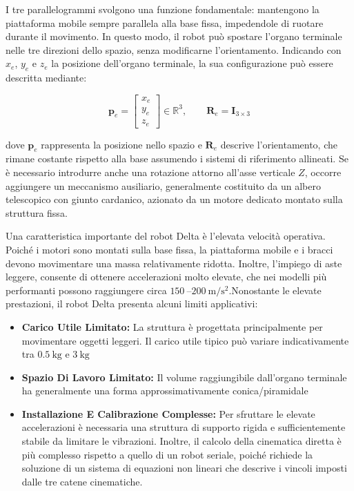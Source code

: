 ﻿\documentclass[11pt, a4paper]{article}
\begin{document}
I tre parallelogrammi svolgono una funzione fondamentale: mantengono la piattaforma mobile sempre parallela alla base fissa, impedendole di ruotare durante il movimento. In questo modo, il robot può spostare l'organo terminale nelle tre direzioni dello spazio, senza modificarne l'orientamento. Indicando con $x_e$, $y_e$ e $z_e$ la posizione dell'organo terminale, la sua configurazione può essere descritta mediante:

\[
    \boldsymbol{p}_e =
    \begin{bmatrix}
        x_e \\ y_e \\ z_e
    \end{bmatrix}
    \in \mathbb{R}^3,
    \qquad
    \boldsymbol{R}_e = \boldsymbol{I}_{3 \times 3}
\]

dove $\boldsymbol{p}_e$ rappresenta la posizione nello spazio e $\boldsymbol{R}_e$ descrive l'orientamento, che rimane costante rispetto alla base assumendo i sistemi di riferimento allineati. Se è necessario introdurre anche una rotazione attorno all'asse verticale $Z$, occorre aggiungere un meccanismo ausiliario, generalmente costituito da un albero telescopico con giunto cardanico, azionato da un motore dedicato montato sulla struttura fissa.

Una caratteristica importante del robot Delta è l'elevata velocità operativa. Poiché i motori sono montati sulla base fissa, la piattaforma mobile e i bracci devono movimentare una massa relativamente ridotta. Inoltre, l'impiego di aste leggere, consente di ottenere accelerazioni molto elevate, che nei modelli più performanti possono raggiungere circa $\SI{150}{}$--$\SI{200}{\meter\per\second\squared}$.Nonostante le elevate prestazioni, il robot Delta presenta alcuni limiti applicativi:

\begin{itemize}
    \item \textbf{Carico Utile Limitato:} La struttura è progettata principalmente per movimentare oggetti leggeri. Il carico utile tipico può variare indicativamente tra $\SI{0.5}{\kilo\gram}$ e $\SI{3}{\kilo\gram}$

    \item \textbf{Spazio Di Lavoro Limitato:} Il volume raggiungibile dall'organo terminale ha generalmente una forma approssimativamente conica/piramidale

    \item \textbf{Installazione E Calibrazione Complesse:} Per sfruttare le elevate accelerazioni è necessaria una struttura di supporto rigida e sufficientemente stabile da limitare le vibrazioni. Inoltre, il calcolo della cinematica diretta è più complesso rispetto a quello di un robot seriale, poiché richiede la soluzione di un sistema di equazioni non lineari che descrive i vincoli imposti dalle tre catene cinematiche.
\end{itemize}
\end{document}
